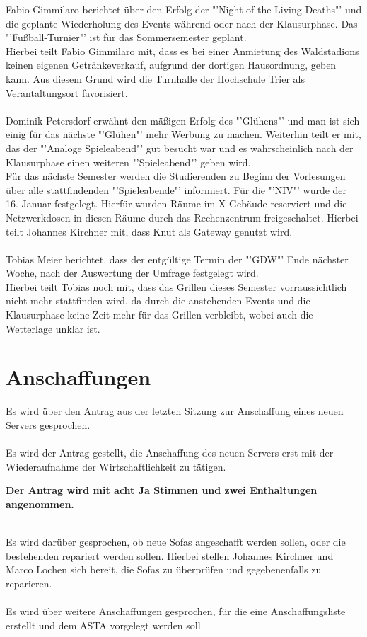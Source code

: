 \documentclass[a4paper, 11pt]{article} %
\begin{document}
Fabio Gimmilaro berichtet über den Erfolg der "'Night of the Living Deaths"' und die geplante Wiederholung des Events während oder nach der Klausurphase.
Das "'Fußball-Turnier"' ist für das Sommersemester geplant.
\\
Hierbei teilt Fabio Gimmilaro mit, dass es bei einer Anmietung des Waldstadions keinen eigenen Getränkeverkauf, aufgrund der dortigen Hausordnung, geben kann. Aus diesem Grund wird die Turnhalle der Hochschule Trier als Verantaltungsort favorisiert.
\\\\
Dominik Petersdorf erwähnt den mäßigen Erfolg des "'Glühens"' und man ist sich einig für das nächste "'Glühen"' mehr Werbung zu machen. Weiterhin teilt er mit, das der "'Analoge Spieleabend"' gut besucht war und es wahrscheinlich nach der Klausurphase einen weiteren "'Spieleabend"' geben wird. 
\\
Für das nächste Semester werden die Studierenden zu Beginn der Vorlesungen über alle stattfindenden "'Spieleabende"' informiert. Für die "'NIV"' wurde der 16. Januar festgelegt. Hierfür wurden Räume im X-Gebäude reserviert und die Netzwerkdosen in diesen Räume durch das Rechenzentrum freigeschaltet. Hierbei teilt Johannes Kirchner mit, dass Knut als Gateway genutzt wird.
\\\\
Tobias Meier berichtet, dass der entgültige Termin der "'GDW"' Ende nächster Woche, nach der Auswertung der Umfrage festgelegt wird.
\\
Hierbei teilt Tobias noch mit, dass das Grillen dieses Semester vorraussichtlich nicht mehr stattfinden wird, da durch die anstehenden Events und die Klausurphase keine Zeit mehr für das Grillen verbleibt, wobei auch die Wetterlage unklar ist.

\section{Anschaffungen}

Es wird über den Antrag aus der letzten Sitzung zur Anschaffung eines neuen Servers gesprochen.
\\\\
Es wird der Antrag gestellt, die Anschaffung des neuen Servers erst mit der Wiederaufnahme der Wirtschaftlichkeit zu tätigen.

\begin{center}
	\textbf{Der Antrag wird mit acht Ja Stimmen und zwei Enthaltungen angenommen.}
\end{center}
\ \\
Es wird darüber gesprochen, ob neue Sofas angeschafft werden sollen, oder die bestehenden repariert werden sollen.
Hierbei stellen Johannes Kirchner und Marco Lochen sich bereit, die Sofas zu überprüfen und gegebenenfalls zu reparieren.
\\\\
Es wird über weitere Anschaffungen gesprochen, für die eine Anschaffungsliste erstellt und dem ASTA vorgelegt werden soll.
\end{document}
